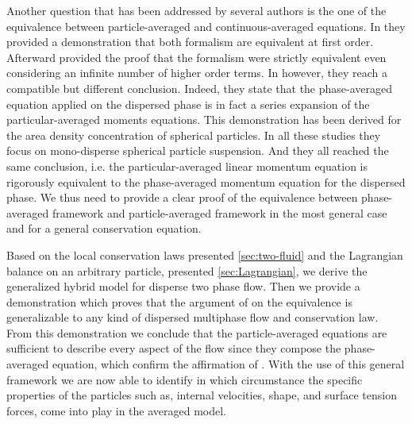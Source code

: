 Another question that has been addressed by several authors \citep{nott2011suspension,zhang1997momentum} is the one of the equivalence between particle-averaged and continuous-averaged equations. 
In \citet[Appendix A]{zhang1997momentum} they provided a demonstration that both formalism are equivalent at first order. 
Afterward \citet[Appendix A]{nott2011suspension} provided the proof that the formalism were strictly equivalent even considering an infinite number of higher order terms. 
In \citet{lhuillier2010multiphase} however, they reach a compatible but different conclusion. 
Indeed, they state that the phase-averaged equation applied on the dispersed phase is in fact a series expansion of the particular-averaged moments equations. 
This demonstration has been derived for the area density concentration of spherical particles. 
In all these studies they focus on mono-disperse spherical particle suspension. 
And they all reached the same conclusion, i.e. the particular-averaged linear momentum equation is rigorously equivalent to the phase-averaged momentum equation for the dispersed phase. 
We thus need to provide a clear proof of the equivalence between phase-averaged framework and particle-averaged framework in the most general case and for a general conservation equation. 


Based on the local conservation laws presented \ref{sec:two-fluid} and the Lagrangian balance on an arbitrary particle, presented \ref{sec:Lagrangian}, we derive the generalized hybrid model for disperse two phase flow. 
Then we provide a demonstration which proves that the argument of \citet{lhuillier2000bilan} on the equivalence is generalizable to any kind of dispersed multiphase flow and conservation law. 
From this demonstration we conclude that the particle-averaged equations are sufficient to describe every aspect of the flow since they compose the phase-averaged equation, which confirm the affirmation of \citet[Appendix A]{zhang1997momentum}. 
With the use of this general framework we are now able to identify in which circumstance the specific properties of the particles such as, internal velocities, shape, and surface tension forces, come into play in the averaged model. 


